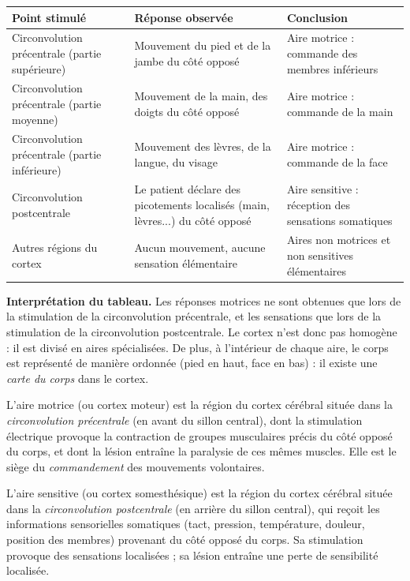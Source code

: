 \documentclass[11pt]{article}
\newcommand{\cle}[1]{{\popxbold\color{popdark}#1}}
\begin{document}
\begin{center}
\begin{tabularx}{\linewidth}{|l|X|X|}
\hline
\rowcolor{popblueL} \textbf{Point stimulé} & \textbf{Réponse observée} & \textbf{Conclusion} \\
\hline
Circonvolution précentrale (partie supérieure) & Mouvement du pied et de la jambe du côté opposé & Aire motrice : commande des membres inférieurs \\
\hline
Circonvolution précentrale (partie moyenne) & Mouvement de la main, des doigts du côté opposé & Aire motrice : commande de la main \\
\hline
Circonvolution précentrale (partie inférieure) & Mouvement des lèvres, de la langue, du visage & Aire motrice : commande de la face \\
\hline
Circonvolution postcentrale & Le patient déclare des picotements localisés (main, lèvres...) du côté opposé & Aire sensitive : réception des sensations somatiques \\
\hline
Autres régions du cortex & Aucun mouvement, aucune sensation élémentaire & Aires non motrices et non sensitives élémentaires \\
\hline
\end{tabularx}
\end{center}

\textbf{Interprétation du tableau.} Les réponses motrices ne sont obtenues que lors de la stimulation de la circonvolution précentrale, et les sensations que lors de la stimulation de la circonvolution postcentrale. Le cortex n'est donc pas homogène : il est divisé en \cle{aires spécialisées}. De plus, à l'intérieur de chaque aire, le corps est représenté de manière ordonnée (pied en haut, face en bas) : il existe une \emph{carte du corps} dans le cortex.

\begin{definition}
L'\cle{aire motrice} (ou \cle{cortex moteur}) est la région du cortex cérébral située dans la \emph{circonvolution précentrale} (en avant du sillon central), dont la stimulation électrique provoque la contraction de groupes musculaires précis du côté opposé du corps, et dont la lésion entraîne la paralysie de ces mêmes muscles. Elle est le siège du \emph{commandement} des mouvements volontaires.
\end{definition}

\begin{definition}
L'\cle{aire sensitive} (ou \cle{cortex somesthésique}) est la région du cortex cérébral située dans la \emph{circonvolution postcentrale} (en arrière du sillon central), qui reçoit les informations sensorielles somatiques (tact, pression, température, douleur, position des membres) provenant du côté opposé du corps. Sa stimulation provoque des sensations localisées ; sa lésion entraîne une perte de sensibilité localisée.
\end{definition}
\end{document}
